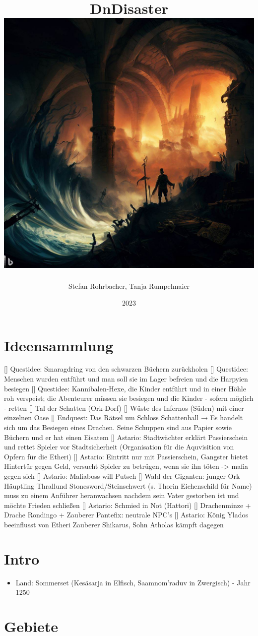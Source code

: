 \documentclass[11pt, twoside]{article}
\author{Stefan Rohrbacher, Tanja Rumpelmaier}
\date{2023}
\title{DnDisaster\\\medskip
\large \includegraphics[width=\linewidth]{wallpaper1.jpeg}}
\begin{document}
\maketitle
\tableofcontents

\newpage

\section{Ideensammlung}
\label{sec:orga27e5f8}

[] Questidee: Smaragdring von den schwarzen Büchern zurückholen
[] Questidee: Menschen wurden entführt und man soll sie im Lager befreien und die Harpyien besiegen
[] Questidee: Kannibalen-Hexe, die Kinder entführt und in einer Höhle roh verspeist; die Abenteurer müssen sie besiegen und die Kinder - sofern möglich - retten
[] Tal der Schatten (Ork-Dorf)
[] Wüste des Infernos (Süden) mit einer einzelnen Oase
[] Endquest: Das Rätsel um Schloss Schattenhall → Es handelt sich um das Besiegen eines Drachen. Seine Schuppen sind aus Papier sowie Büchern und er hat einen Eisatem
[] Astario: Stadtwächter erklärt Passierschein und rettet Spieler vor Stadtsicherheit (Organisation für die Aquvisition von Opfern für die Etheri)
[] Astario: Eintritt nur mit Passierschein, Gangster bietet Hintertür gegen Geld, versucht Spieler zu betrügen, wenn sie ihn töten -> mafia gegen sich
[] Astario: Mafiaboss will Putsch
[] Wald der Giganten: junger Ork Häuptling Thrallund Stonesword/Steinschwert (s. Thorin Eichenschild für Name) muss zu einem Anführer heranwachsen nachdem sein Vater gestorben ist und möchte Frieden schließen
[] Astario: Schmied in Not (Hattori)
[] Drachenminze + Drache Rondingo + Zauberer Pantefix: neutrale NPC's
[] Astario:  König Ylados beeinflusst von Etheri Zauberer Shikarus, Sohn Atholas kämpft dagegen


\section{Intro}
\label{sec:org293f51f}
\begin{itemize}
\item Land: Sommerset (Kesäsarja in Elfisch, Saamnom’raduv in Zwergisch) - Jahr 1250
\end{itemize}

\section{Gebiete}
\label{sec:org7e4f2b2}
\end{document}
